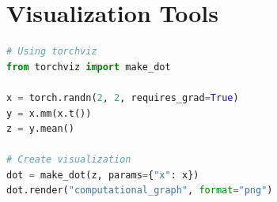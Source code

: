\documentclass{article}
\begin{document}
\section{Visualization Tools}

\begin{lstlisting}[language=Python, caption=Visualizing Computational Graphs]
# Using torchviz
from torchviz import make_dot

x = torch.randn(2, 2, requires_grad=True)
y = x.mm(x.t())
z = y.mean()

# Create visualization
dot = make_dot(z, params={"x": x})
dot.render("computational_graph", format="png")
\end{lstlisting}
\end{document}
